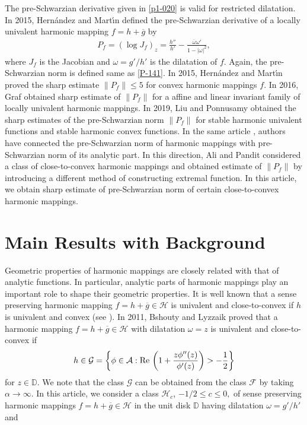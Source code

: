 \documentclass[a4paper,12pt]{amsart}
\theoremstyle{definition}
\newcounter {own}
\begin{document}
	The pre-Schwarzian derivative given in  \eqref{p1-020} is valid for restricted  dilatation. In 2015, Hern{\'a}ndez and Mart{\'\i}n \cite{Hernandez-Martin-2015} defined the pre-Schwarzian derivative of a locally univalent harmonic mapping $f=h+\overline{g}$ by\\
	\begin{align}\label{p1-027}
		P_f = \left(\log J_f\right)_z = \frac{h''}{h'}-\frac{\overline{\omega}\omega'}{1-|\omega|^2},
	\end{align}
	where $J_f$ is the Jacobian and $\omega=g'/h'$ is the dilatation of $f$. Again, the pre-Schwarzian norm is defined same as \eqref{P-141}. In 2015, Hern{\'a}ndez and Mart{\'\i}n \cite{Hernandez-Martin-2015} proved the sharp estimate $\|P_f\|\le 5$ for convex harmonic mappings $f$. In 2016, Graf \cite{GRAF-2016} obtained sharp estimate of $\|P_f\|$ for a affine and linear invariant family of locally univalent harmonic mappings. In 2019, Liu and Ponnusamy \cite{Liu-Ponnusamy-2018} obtained the sharp estimates of the pre-Schwarzian norm $\|P_f\|$ for stable harmonic univalent functions and stable harmonic convex functions. In the same article \cite{Liu-Ponnusamy-2018}, authors have connected the pre-Schwarzian norm of harmonic mappings with pre-Schwarzian norm of its analytic part. In this direction, Ali and Pandit \cite{Ali-Pandit-2023} considered a class of close-to-convex harmonic mappings and obtained estimate of $\|P_f\|$ by introducing a different method of constructing extremal function. In this article, we obtain sharp estimate of pre-Schwarzian norm of certain close-to-convex harmonic mappings.\\
	
	
	
	
	
		
	
	
	
	\section{Main Results with Background}\label{Sect-2}
	Geometric properties of harmonic mappings are closely related with that of analytic functions. In particular, analytic parts of harmonic mappings play an important role to shape their geometric properties. It is well known that a sense preserving harmonic mapping $f=h+\overline{g}\in\mathcal{H}$ is univalent and close-to-convex if $h$ is univalent and convex (see \cite{Clunie-Small-1984}). In 2011, Bshouty and Lyzzaik \cite{Bshouty-Lyzzaik-2011} proved that a harmonic mapping $f=h+\overline{g}\in\mathcal{H}$ with dilatation $\omega=z$ is univalent and close-to-convex if 
	\begin{align*}
	h\in\mathcal{G}=\left\{\phi\in\mathcal{A}:{\rm Re\,}\left(1+\frac{z\phi''(z)}{\phi'(z)}\right)>-\frac{1}{2}\right\}
	\end{align*}
	   for $z\in\mathbb{D}$. We note that the class $\mathcal{G}$ can be obtained from the class $\mathcal{F}$ by taking $\alpha\rightarrow\infty.$ In this article, we consider a class $\mathcal{H}_c$, $-1/2\le c\le 0,$ of sense preserving harmonic mappings $f=h+\overline{g}\in\mathcal{H}$ in the unit disk $\mathbb{D}$ having dilatation $\omega=g'/h'$ and 
	   
\end{document}
